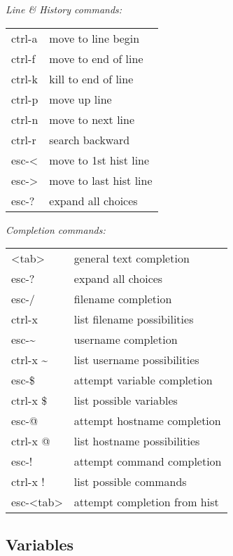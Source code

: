 \textit{Line \& History commands:}\\
\begin{tabular}{l  l}
    ctrl-a      & move to line begin \\
    ctrl-f      & move to end of line \\
    ctrl-k      & kill to end of line \\
    ctrl-p      & move up line \\
    ctrl-n      & move to next line \\
    ctrl-r      & search backward \\
    esc-<       & move to 1st hist line \\
    esc->       & move to last hist line \\
    esc-?       & expand all choices \\ 
\end{tabular}


\textit{Completion commands:}\\
\begin{tabular}{l  l}
    <tab>       & general text completion \\
    esc-?       & expand all choices \\ 
    esc-/       & filename completion \\
    ctrl-x      & list filename possibilities \\
    esc-\textasciitilde     & username completion \\
    ctrl-x \textasciitilde  & list username possibilities \\
    esc-\$      & attempt variable completion \\
    ctrl-x \$   & list possible variables \\
    esc-@       & attempt hostname completion \\
    ctrl-x @    & list hostname possibilities \\
    esc-!       & attempt command completion \\
    ctrl-x !    & list possible commands \\
    esc-<tab>   & attempt completion from hist \\
\end{tabular}



\subsection*{Variables}

